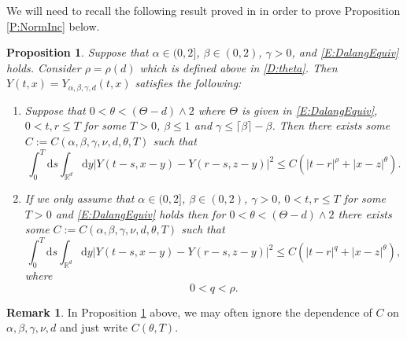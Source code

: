 \documentclass[a4paper,11pt]{article}
\numberwithin{equation}{section}
\theoremstyle{plain}
\newtheorem{proposition}[theorem]{Proposition}
\theoremstyle{definition}
\newtheorem{remark}[theorem]{Remark}
\newcommand{\ud}{\ensuremath{\mathrm{d} }}
\newcommand{\R}{\mathbb{R}}
\numberwithin{NQ}{section}
\numberwithin{LQ}{section}
\numberwithin{ZQ}{section}
\begin{document}
	We will need to recall the following result proved in \cite{CHN19} in order to prove Proposition \ref{P:NormInc} below. 
	
	\begin{proposition}{\normalfont\cite[Proposition 2.1 and 2.2]{ChenHu21}}
		\label{P:YInc}
		Suppose that $\alpha \in (0,2]$, $\beta \in (0,2)$, $\gamma>0$, and \eqref{E:DalangEquiv} holds. Consider $\rho = \rho(d)$ which is defined above in \eqref{D:theta}. Then $Y(t,x) = Y_{\alpha, \beta, \gamma, d}(t,x)$ satisfies the following:
		\begin{enumerate}
			\item \label{P:YIncCase1}  Suppose that $0< \theta < (\Theta -d) \wedge 2$ where $\Theta$ is given in \eqref{E:DalangEquiv}, $0< t,r \le T$ for some $T>0$, $\beta \le 1$ and $\gamma \le \lceil \beta \rceil - \beta$. Then there exists some $C := C(\alpha, \beta, \gamma, \nu, d, \theta, T)$ such that
			\[
			\int_0^T \ud s \int_{\R^d} \ud y |Y(t-s,x-y) - Y(r-s,z-y)|^2 \le C \left(|t-r|^\rho + |x-z|^{\theta}\right).
			\]
			\item \label{P:YIncCase2} If we only assume that $\alpha \in (0,2]$, $\beta \in (0,2)$, $\gamma>0$, $0< t,r \le T$ for some $T>0$ and \eqref{E:DalangEquiv} holds then for $0< \theta < (\Theta -d) \wedge 2$ there exists some $C := C(\alpha, \beta, \gamma, \nu, d, \theta, T)$ such that
			\[
			\int_0^T \ud s \int_{\R^d} \ud y |Y(t-s,x-y) - Y(r-s,z-y)|^2 \le C \left(|t-r|^q + |x-z|^{\theta}\right),
			\]
			where 
			\[
			0 < q < \rho.
			\]
		\end{enumerate}
	\end{proposition}
	
	\begin{remark}
		In Proposition \ref{P:YInc} above, we may often ignore the dependence of $C$ on $\alpha, \beta, \gamma, \nu, d$ and just write $C(\theta, T)$. 
	\end{remark}
	
\end{document}
